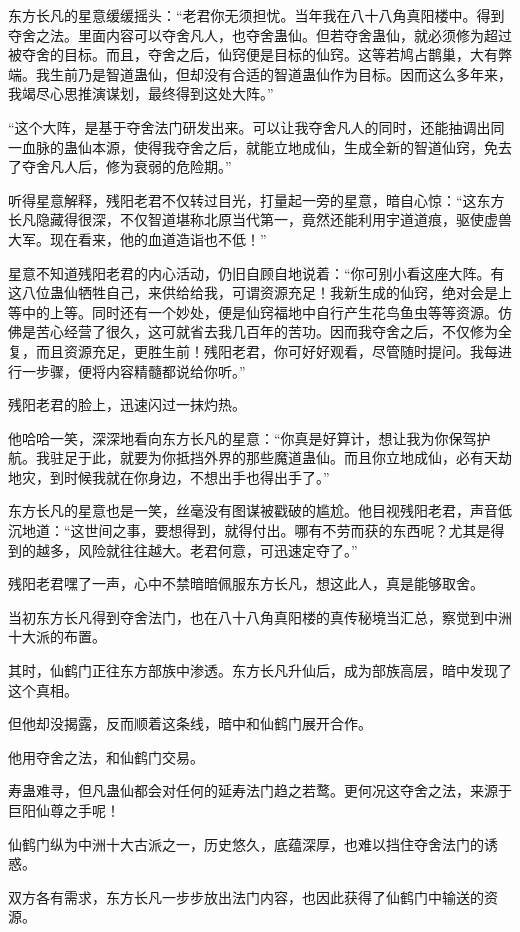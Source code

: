 \begin{this_body}
东方长凡的星意缓缓摇头：“老君你无须担忧。当年我在八十八角真阳楼中。得到夺舍之法。里面内容可以夺舍凡人，也夺舍蛊仙。但若夺舍蛊仙，就必须修为超过被夺舍的目标。而且，夺舍之后，仙窍便是目标的仙窍。这等若鸠占鹊巢，大有弊端。我生前乃是智道蛊仙，但却没有合适的智道蛊仙作为目标。因而这么多年来，我竭尽心思推演谋划，最终得到这处大阵。”

“这个大阵，是基于夺舍法门研发出来。可以让我夺舍凡人的同时，还能抽调出同一血脉的蛊仙本源，使得我夺舍之后，就能立地成仙，生成全新的智道仙窍，免去了夺舍凡人后，修为衰弱的危险期。”

听得星意解释，残阳老君不仅转过目光，打量起一旁的星意，暗自心惊：“这东方长凡隐藏得很深，不仅智道堪称北原当代第一，竟然还能利用宇道道痕，驱使虚兽大军。现在看来，他的血道造诣也不低！”

星意不知道残阳老君的内心活动，仍旧自顾自地说着：“你可别小看这座大阵。有这八位蛊仙牺牲自己，来供给给我，可谓资源充足！我新生成的仙窍，绝对会是上等中的上等。同时还有一个妙处，便是仙窍福地中自行产生花鸟鱼虫等等资源。仿佛是苦心经营了很久，这可就省去我几百年的苦功。因而我夺舍之后，不仅修为全复，而且资源充足，更胜生前！残阳老君，你可好好观看，尽管随时提问。我每进行一步骤，便将内容精髓都说给你听。”

残阳老君的脸上，迅速闪过一抹灼热。

他哈哈一笑，深深地看向东方长凡的星意：“你真是好算计，想让我为你保驾护航。我驻足于此，就要为你抵挡外界的那些魔道蛊仙。而且你立地成仙，必有天劫地灾，到时候我就在你身边，不想出手也得出手了。”

东方长凡的星意也是一笑，丝毫没有图谋被戳破的尴尬。他目视残阳老君，声音低沉地道：“这世间之事，要想得到，就得付出。哪有不劳而获的东西呢？尤其是得到的越多，风险就往往越大。老君何意，可迅速定夺了。”

残阳老君嘿了一声，心中不禁暗暗佩服东方长凡，想这此人，真是能够取舍。

当初东方长凡得到夺舍法门，也在八十八角真阳楼的真传秘境当汇总，察觉到中洲十大派的布置。

其时，仙鹤门正往东方部族中渗透。东方长凡升仙后，成为部族高层，暗中发现了这个真相。

但他却没揭露，反而顺着这条线，暗中和仙鹤门展开合作。

他用夺舍之法，和仙鹤门交易。

寿蛊难寻，但凡蛊仙都会对任何的延寿法门趋之若鹜。更何况这夺舍之法，来源于巨阳仙尊之手呢！

仙鹤门纵为中洲十大古派之一，历史悠久，底蕴深厚，也难以挡住夺舍法门的诱惑。

双方各有需求，东方长凡一步步放出法门内容，也因此获得了仙鹤门中输送的资源。


\end{this_body}
